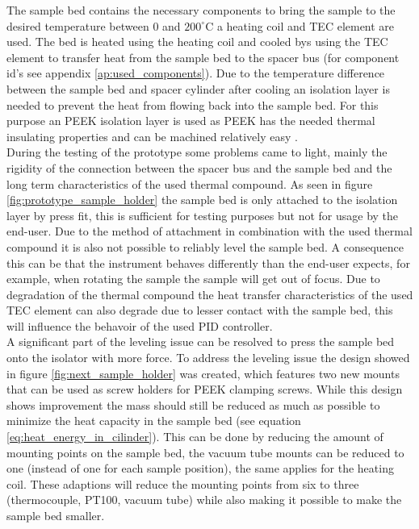 \documentclass[10pt]{article}
\begin{document}
The sample bed contains the necessary components to bring the sample to the desired temperature between $0$ and $200^\circ$C a heating coil and TEC element are used. 
The bed is heated using the heating coil and cooled bys using the TEC element to transfer heat from the sample bed to the spacer bus (for component id's see appendix \ref{ap:used_components}).
Due to the temperature difference between the sample bed and spacer cylinder after cooling an isolation layer is needed to prevent the heat from flowing back into the sample bed.
For this purpose an PEEK isolation layer is used as PEEK has the needed thermal insulating properties and can be machined relatively easy \cite{lingPolyetherEtherKetone2020}.\\

During the testing of the prototype some problems came to light, mainly the rigidity of the connection between the spacer bus and the sample bed and the long term characteristics of the used thermal compound.
As seen in figure \ref{fig:prototype_sample_holder} the sample bed is only attached to the isolation layer by press fit, this is sufficient for testing purposes but not for usage by the end-user.
Due to the method of attachment in combination with the used thermal compound it is also not possible to reliably level the sample bed.
A consequence this can be that the instrument behaves differently than the end-user expects, for example, when rotating the sample the sample will get out of focus.
Due to degradation of the thermal compound the heat transfer characteristics of the used TEC element can also degrade due to lesser contact with the sample bed, this will influence the behavoir of the used PID controller.\\

A significant part of the leveling issue can be resolved to press the sample bed onto the isolator with more force.
To address the leveling issue the design showed in figure \ref{fig:next_sample_holder} was created, which features two new mounts that can be used as screw holders for PEEK clamping screws.
While this design shows improvement the mass should still be reduced as much as possible to minimize the heat capacity in the sample bed (see equation \ref{eq:heat_energy_in_cilinder}).
This can be done by reducing the amount of mounting points on the sample bed, the vacuum tube mounts can be reduced to one (instead of one for each sample position), the same applies for the heating coil.
These adaptions will reduce the mounting points from six to three (thermocouple, PT100, vacuum tube) while also making it possible to make the sample bed smaller.
\end{document}
